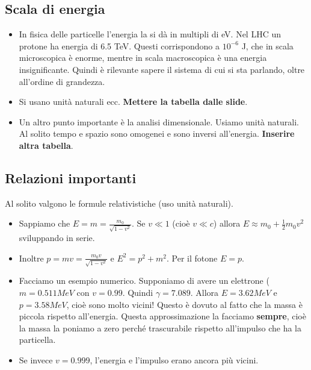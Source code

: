 \subsection{Scala di energia}
\begin{itemize}
    \item In fisica delle particelle l'energia la si dà in multipli di eV. Nel LHC un protone ha energia di 6.5 TeV. Questi corrispondono a $10^{-6}$ J, che in scala microscopica è enorme, mentre in scala macroscopica è una energia insignificante. Quindi è rilevante sapere il sistema di cui si sta parlando, oltre all'ordine di grandezza.
    \item Si usano unità naturali ecc. \textbf{Mettere la tabella dalle slide}.
    \item Un altro punto importante è la analisi dimensionale. Usiamo unità naturali. Al solito tempo e spazio sono omogenei e sono inversi all'energia. \textbf{Inserire altra tabella}.
\end{itemize}
\subsection{Relazioni importanti}
Al solito valgono le formule relativistiche (uso unità naturali).
\begin{itemize}
    \item Sappiamo che $E=m=\frac{m_0}{\sqrt{1-v^2}}$. Se $v\ll 1$ (cioè $v\ll c$) allora $E\approx m_0+\frac12 m_0v^2$ sviluppando in serie.
    \item Inoltre $p=mv=\frac{m_0v}{\sqrt{1-v^2}}$ e $E^2=p^2+m^2$. Per il fotone $E=p$.
    \item Facciamo un esempio numerico. Supponiamo di avere un elettrone ($m=0.511 MeV$ con $v=0.99$. Quindi $\gamma = 7.089$. Allora $E=3.62 MeV$ e $p=3.58 MeV$, cioè sono molto vicini! Questo è dovuto al fatto che la massa è piccola rispetto all'energia. Questa approssimazione la facciamo \textbf{sempre}, cioè la massa la poniamo a zero perché trascurabile rispetto all'impulso che ha la particella. 
    \item Se invece $v=0.999$, l'energia e l'impulso erano ancora più vicini.
\end{itemize}